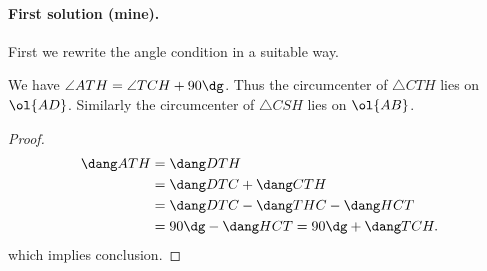\documentclass[11pt]{scrartcl}
\begin{document}
\paragraph{First solution (mine).}
First we rewrite the angle condition in a suitable way.
\begin{claim*}
  We have $\angle ATH = \angle TCH + 90\dg$.
  Thus the circumcenter of $\triangle CTH$ lies on $\ol{AD}$.
  Similarly the circumcenter of $\triangle CSH$ lies on $\ol{AB}$.
\end{claim*}
\begin{proof}
  \begin{align*}
    \dang ATH &= \dang DTH \\
    &= \dang DTC + \dang CTH \\
    &= \dang DTC - \dang THC - \dang HCT \\
    &= 90\dg - \dang HCT = 90\dg + \dang TCH.
  \end{align*}
  which implies conclusion.
\end{proof}
\end{document}
